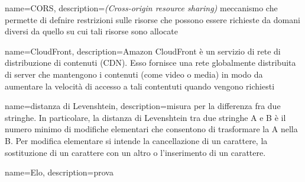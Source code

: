 {
	name=CORS,
	description={\emph{(Cross-origin resource sharing)} meccanismo che permette di defnire restrizioni sulle risorse
	che possono essere richieste da domani diversi da quello su cui tali risorse sono allocate}
}

{
	name=CloudFront,
	description={Amazon CloudFront è un servizio di rete di distribuzione di contenuti (CDN). Esso fornisce una rete 
	globalmente distribuita di server che mantengono i contenuti (come video o media) in modo da aumentare la velocità di accesso a tali contentuti quando vengono richiesti}
}

{
	name=distanza di Levenshtein,
	description={misura per la differenza fra due stringhe. In particolare, la distanza di Levenshtein tra due stringhe
	A e B è il numero minimo di modifiche elementari che consentono di trasformare la A nella B. Per modifica elementare si intende la cancellazione di un carattere, la sostituzione di un carattere con un altro o l'inserimento di un carattere.}
}

{
	name=Elo,
	description={prova}
}